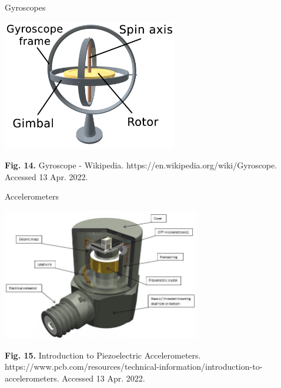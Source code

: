 \documentclass[14pt]{beamer}
\theoremstyle{plain}
\theoremstyle{definition}
\theoremstyle{remark}
\begin{document}

\begin{frame}{Gyroscopes}
\begin{center}
\includegraphics[width=3in]{Image Gyroscope.png}
\end{center}
\tiny{\textbf{Fig. 14.} Gyroscope - Wikipedia. https://en.wikipedia.org/wiki/Gyroscope. Accessed 13 Apr. 2022.}
\end{frame}

\begin{frame}{Accelerometers}
\begin{center}
\includegraphics[width=3.4in]{Image Accelerometer.jpg}
\end{center}
\tiny{\textbf{Fig. 15.} Introduction to Piezoelectric Accelerometers. https://www.pcb.com/resources/technical-information/introduction-to-accelerometers. Accessed 13 Apr. 2022.}
\end{frame}
\end{document}
